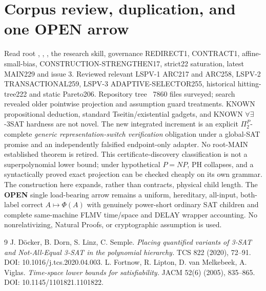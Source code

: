 \documentclass[11pt]{article}
\begin{document}
\section{Corpus review, duplication, and one OPEN arrow}
Read root , , , the research skill, governance REDIRECT1, CONTRACT1, affine-small-bias, CONSTRUCTION-STRENGTHEN17, strict22 saturation, latest MAIN229 and issue 3. Reviewed relevant LSPV-1 ARC217 and ARC258, LSPV-2 TRANSACTIONAL259, LSPV-3 ADAPTIVE-SELECTOR255, historical hitting-tree222 and static Pareto206. Repository tree ~7860 files surveyed; search revealed older pointwise projection and assumption guard treatments. KNOWN propositional deduction, standard Tseitin/existential gadgets, and KNOWN $\forall\exists$-3SAT hardness are not novel. The new integrated increment is an explicit $\Pi_2^P$-complete \emph{generic representation-switch verification} obligation under a global-SAT promise and an independently falsified endpoint-only adapter. No root-MAIN established theorem is retired.
This certificate-discovery classification is not a superpolynomial lower bound; under hypothetical $P=NP$, PH collapses, and a syntactically proved exact projection can be checked cheaply on its own grammar. The construction here expands, rather than contracts, physical child length. The \textbf{OPEN} single load-bearing arrow remains a uniform, hereditary, all-input, both-label correct $A\mapsto\Phi(A)$ with genuinely power-short ordinary SAT children and complete same-machine FLMV time/space and DELAY wrapper accounting. No nonrelativizing, Natural Proofs, or cryptographic assumption is used.
\begin{thebibliography}{9}
 J. D\"ocker, B. Dorn, S. Linz, C. Semple. \emph{Placing quantified variants of 3-SAT and Not-All-Equal 3-SAT in the polynomial hierarchy.} TCS 822 (2020), 72--91. DOI: 10.1016/j.tcs.2020.04.003.
 L. Fortnow, R. Lipton, D. van Melkebeek, A. Viglas. \emph{Time-space lower bounds for satisfiability.} JACM 52(6) (2005), 835--865. DOI: 10.1145/1101821.1101822.
\end{thebibliography}
\end{document}
